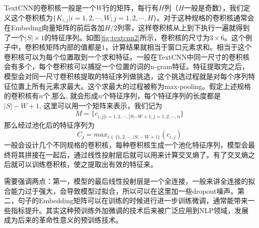 \documentclass[twoside,a4paper,12pt]{book}%
\begin{document}
TextCNN的卷积核一般是一个$W$行的矩阵，每行有$H$列（$H$一般是奇数），我们定义这个卷积核为$\{K_{i,j}|i=1,2,\cdots,W;j=1,2,\cdots,H\}$。对于这种规格的卷积核通常会在Embeding向量矩阵的前后各加$H/2$列零，这样卷积核从上到下执行一遍就得到了一个$|S| \times 1$的特征序列。如图\ref{fig:textcnn2}所示，卷积核的尺寸为$3 \times 6$。这个例子中，卷积核矩阵内部的值都是$1$，计算结果就相当于窗口元素求和。相当于这个卷积核可以为每个位置取到一个求和特征。一般在TextCNN中同一尺寸的卷积核会有多个，每个卷积核可以捕捉一个位置的词的n-gram特征。特征提取完之后，模型会对同一尺寸卷积核提取的特征序列做挑选，这个挑选过程就是对每个序列特征位置上所有元素求最大。这个求最大的过程被称为max-pooling。假定上述规格的卷积核有$n$个,那么, 就会形成$n$个特征序列，每个特征序列的长度都是$|S|-
W + 1$, 这里可以用一个矩阵来表示，我们记为
$$
M=\{c_{i,j|i=1,2,\cdots, |S|-W+1; j =1,2,\cdots,n}\}
$$
那么经过池化后的特征序列为
$$
C_j=max_{i \in \{1,2,\cdots,|S|-W+1\}}(c_{i,j})
$$
一般会设计几个不同规格的卷积核，每种卷积核生成一个池化特征序列，模型会最终将其拼接在一起后，通过线性投射层后就可以用来计算交叉熵了。有了交叉熵之后就可以训练卷积核，使之提取出有效的特征来。

需要强调两点：第一，模型的最后线性投射层是一个全连接，一般来讲全连接的拟合能力过于强大，会导致模型过拟合，所以可以在这里加一些dropout噪声。第二，句子的Embedding矩阵可以在训练的时候进行进一步训练微调，通常能带来一些指标提升。其实这种预训练外加微调的技术后来被广泛应用到\gls{NLP}领域，发展成为后来的革命性意义的预训练技术。
\end{document}
